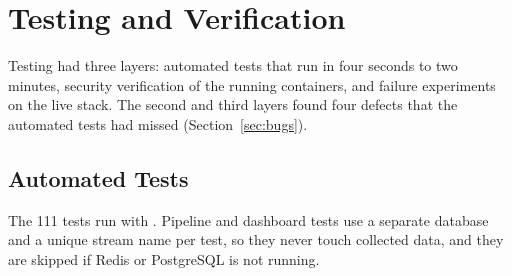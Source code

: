 \chapter{Testing and Verification}
\label{ch:testing}

Testing had three layers: automated tests that run in four seconds to two minutes, security
verification of the running containers, and failure experiments on the live stack. The second
and third layers found four defects that the automated tests had missed (Section~\ref{sec:bugs}).

\section{Automated Tests}

The 111 tests run with . Pipeline and dashboard tests use a separate
 database and a unique stream name per test, so they never touch collected
data, and they are skipped if Redis or PostgreSQL is not running.

